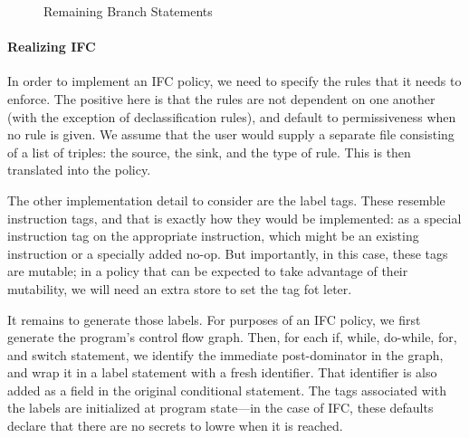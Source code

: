 \documentclass{article}
\begin{document}
\begin{figure}
\begin{subfigure}{\textwidth}
  \end{subfigure}

  
  
  \caption{Remaining Branch Statements}
  \label{fig:rest}
\end{figure}

\paragraph*{Realizing IFC}

In order to implement an IFC policy, we need to specify the rules that it needs to enforce.
The positive here is that the rules are not dependent on one another (with the exception of
declassification rules), and default to permissiveness when no rule is given. We assume that
the user would supply a separate file consisting of a list of triples: the source, the sink,
and the type of rule. This is then translated into the policy.

The other implementation detail to consider are the label tags. These resemble
instruction tags, and that is exactly how they would be implemented: as a special instruction
tag on the appropriate instruction, which might be an existing instruction or a specially
added no-op. But importantly, in this case, these tags are mutable; in a policy that can be
expected to take advantage of their mutability, we will need an extra store to set the tag
fot leter.

It remains to generate those labels. For purposes of an IFC policy, we first generate the program's
control flow graph. Then, for each if, while, do-while, for, and switch statement, we identify the
immediate post-dominator in the graph, and wrap it in a label statement with a fresh identifier.
That identifier is also added as a field in the original conditional statement. The tags
associated with the labels are initialized at program state---in the case of IFC, these defaults
declare that there are no secrets to lowre when it is reached.
\end{document}
